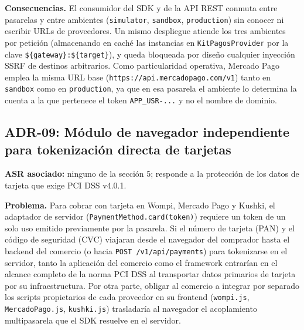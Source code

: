 \textbf{Consecuencias.} El consumidor del SDK y de la API REST conmuta entre pasarelas y entre ambientes (\texttt{simulator}, \texttt{sandbox}, \texttt{production}) sin conocer ni escribir URLs de proveedores. Un mismo despliegue atiende los tres ambientes por petición (almacenando en caché las instancias en \texttt{KitPagosProvider} por la clave \texttt{\$\{gateway\}:\$\{target\}}), y queda bloqueada por diseño cualquier inyección SSRF de destinos arbitrarios. Como particularidad operativa, Mercado Pago emplea la misma URL base (\texttt{https://api.mercadopago.com/v1}) tanto en \texttt{sandbox} como en \texttt{production}, ya que en esa pasarela el ambiente lo determina la cuenta a la que pertenece el token \texttt{APP\_USR-...} y no el nombre de dominio.

\subsection{ADR-09: Módulo de navegador independiente para tokenización directa de tarjetas}
\textbf{ASR asociado:} ninguno de la sección 5; responde a la protección de los datos de tarjeta que exige PCI DSS v4.0.1.

\textbf{Problema.} Para cobrar con tarjeta en Wompi, Mercado Pago y Kushki, el adaptador de servidor (\texttt{PaymentMethod.\allowbreak{}card(\allowbreak{}token)}) requiere un token de un solo uso emitido previamente por la pasarela. Si el número de tarjeta (PAN) y el código de seguridad (CVC) viajaran desde el navegador del comprador hasta el backend del comercio (o hacia \texttt{POST /\allowbreak{}v1/\allowbreak{}api/\allowbreak{}payments}) para tokenizarse en el servidor, tanto la aplicación del comercio como el framework entrarían en el alcance completo de la norma PCI DSS al transportar datos primarios de tarjeta por su infraestructura. Por otra parte, obligar al comercio a integrar por separado los scripts propietarios de cada proveedor en su frontend (\texttt{wompi.js}, \texttt{MercadoPago.js}, \texttt{kushki.js}) trasladaría al navegador el acoplamiento multipasarela que el SDK resuelve en el servidor.

